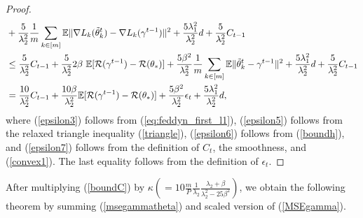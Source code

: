 \documentclass{article} %
\begin{document}
\begin{proof}
\begin{align}
    & + \frac{5}{\lambda_2^2}\frac{1}{m}\sum_{k\in[m]}\mathbb{E}\lVert \nabla L_k(\Tilde{\theta}_k^t)-\nabla L_k(\gamma^{t-1}) \rVert^2
    +\frac{5\lambda_1^2}{\lambda_2^2}d+\frac{5}{\lambda_2^2}C_{t-1}\\
    &\label{epsilon7}\le \frac{5}{\lambda_2^2}C_{t-1}
    + \frac{5}{\lambda_2^2}2\beta\ \mathbb{E}[\mathcal{R}(\gamma^{t-1})-\mathcal{R}(\theta_*)] 
    + \frac{5\beta^2}{\lambda_2^2}\frac{1}{m}\sum_{k\in[m]}\mathbb{E}\lVert \Tilde{\theta}_k^t -\gamma^{t-1}\rVert^2
    +\frac{5\lambda_1^2}{\lambda_2^2}d+\frac{5}{\lambda_2^2}C_{t-1}\\
    &= \frac{10}{\lambda_2^2}C_{t-1}+\frac{10\beta}{\lambda_2^2}\mathbb{E}[\mathcal{R}(\gamma^{t-1})-\mathcal{R}(\theta_*)]+\frac{5\beta^2}{\lambda_2^2}\epsilon_t+\frac{5\lambda_1^2}{\lambda_2^2}d, \nonumber
\end{align}
where (\ref{epsilon3}) follows from (\ref{eq:feddyn_first_l1}), (\ref{epsilon5}) follows from the relaxed triangle inequality (\ref{triangle}), (\ref{epsilon6}) follows from (\ref{boundh}), and (\ref{epsilon7}) follows from the definition of $C_t$, the smoothness, and (\ref{convex1}). The last equality follows from the definition of $\epsilon_t$.  
\end{proof}

After multiplying (\ref{boundC}) by $\kappa(=10\frac{m}{P}\frac{1}{\lambda_2}\frac{\lambda_2+\beta}{\lambda_2^2-25\beta^2})$, we obtain the following theorem by summing (\ref{msegammatheta}) and scaled version of (\ref{MSEgamma}).


\end{document}
